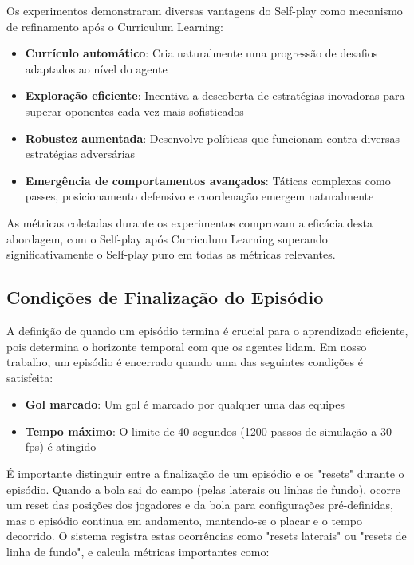 Os experimentos demonstraram diversas vantagens do Self-play como mecanismo de refinamento após o Curriculum Learning:

\begin{itemize}
    \item \textbf{Currículo automático}: Cria naturalmente uma progressão de desafios adaptados ao nível do agente
    \item \textbf{Exploração eficiente}: Incentiva a descoberta de estratégias inovadoras para superar oponentes cada vez mais sofisticados
    \item \textbf{Robustez aumentada}: Desenvolve políticas que funcionam contra diversas estratégias adversárias
    \item \textbf{Emergência de comportamentos avançados}: Táticas complexas como passes, posicionamento defensivo e coordenação emergem naturalmente
\end{itemize}

As métricas coletadas durante os experimentos comprovam a eficácia desta abordagem, com o Self-play após Curriculum Learning superando significativamente o Self-play puro em todas as métricas relevantes.

\subsection{Condições de Finalização do Episódio}

A definição de quando um episódio termina é crucial para o aprendizado eficiente, pois determina o horizonte temporal com que os agentes lidam. Em nosso trabalho, um episódio é encerrado quando uma das seguintes condições é satisfeita:

\begin{itemize}
    \item \textbf{Gol marcado}: Um gol é marcado por qualquer uma das equipes
    \item \textbf{Tempo máximo}: O limite de 40 segundos (1200 passos de simulação a 30 fps) é atingido
\end{itemize}

É importante distinguir entre a finalização de um episódio e os "resets" durante o episódio. Quando a bola sai do campo (pelas laterais ou linhas de fundo), ocorre um reset das posições dos jogadores e da bola para configurações pré-definidas, mas o episódio continua em andamento, mantendo-se o placar e o tempo decorrido. O sistema registra estas ocorrências como "resets laterais" ou "resets de linha de fundo", e calcula métricas importantes como:

